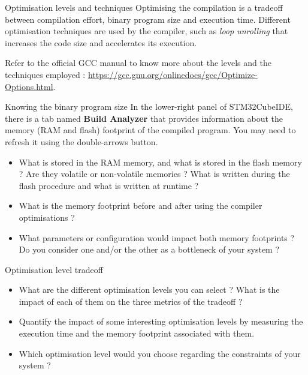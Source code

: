 \begin{bclogo}[couleur = gray!20, arrondi = 0.2, logo=\bcinfo]{Optimisation levels and techniques}
Optimising the compilation is a tradeoff between compilation effort, binary program size and execution time. Different optimisation techniques are used by the compiler, such as \textit{loop unrolling} that increases the code size and accelerates its execution.

Refer to the official GCC manual to know more about the levels and the techniques employed : \url{https://gcc.gnu.org/onlinedocs/gcc/Optimize-Options.html}.%
\end{bclogo}

\begin{bclogo}[couleur = gray!20, arrondi = 0.2, logo=\bcquestion]{Knowing the binary program size}
In the lower-right panel of STM32CubeIDE, there is a tab named \textbf{Build Analyzer} that provides information about the memory (RAM and flash) footprint of the compiled program. You may need to refresh it using the double-arrows button.

\begin{itemize}
	\item What is stored in the RAM memory, and what is stored in the flash memory ? Are they volatile or non-volatile memories ? What is written during the flash procedure and what is written at runtime ?
	\item What is the memory footprint before and after using the compiler optimisations ?
	\item What parameters or configuration would impact both memory footprints ? Do you consider one and/or the other as a bottleneck of your system ?
\end{itemize}
\end{bclogo}

\begin{bclogo}[couleur = gray!20, arrondi = 0.2, logo=\bcquestion]{Optimisation level tradeoff}
\begin{itemize}
\item What are the different optimisation levels you can select ? What is the impact of each of them on the three metrics of the tradeoff ?
\item Quantify the impact of some interesting optimisation levels by measuring the execution time and the memory footprint associated with them.
\item Which optimisation level would you choose regarding the constraints of your system ?
\end{itemize}
\end{bclogo}

